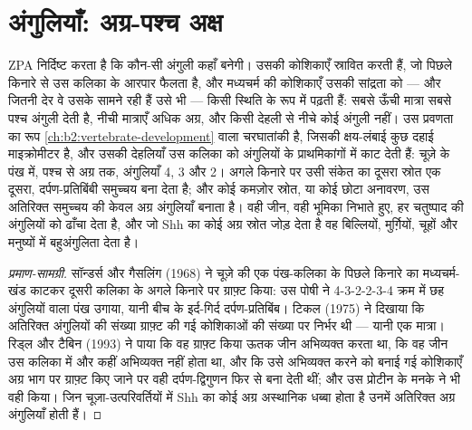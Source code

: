 \section{अंगुलियाँ: अग्र-पश्च अक्ष}

\begin{proposition}[ध्रुवणकारी सक्रियता क्षेत्र]\label{prop:b2:limb-organogenesis:zpa}
ZPA निर्दिष्ट करता है कि कौन-सी अंगुली कहाँ बनेगी। उसकी कोशिकाएँ
 स्रावित करती हैं, जो पिछले किनारे से उस कलिका के
आरपार फैलता है, और मध्यचर्म की कोशिकाएँ उसकी सांद्रता को --- और जितनी
देर वे उसके सामने रही हैं उसे भी --- किसी स्थिति के रूप में पढ़ती हैं:
सबसे ऊँची मात्रा सबसे पश्च अंगुली देती है, नीची मात्राएँ अधिक अग्र, और
किसी देहली से नीचे कोई अंगुली नहीं। उस प्रवणता का रूप
\cref{ch:b2:vertebrate-development} वाला चरघातांकी है, जिसकी क्षय-लंबाई
कुछ दहाई माइक्रोमीटर है, और उसकी देहलियाँ उस कलिका को
अंगुलियों के प्राथमिकांगों में काट देती हैं: चूज़े के पंख में, पश्च से
अग्र तक, अंगुलियाँ 4, 3 और 2। अगले किनारे पर उसी संकेत का दूसरा स्रोत
एक दूसरा, दर्पण-प्रतिबिंबी समुच्चय बना देता है; और कोई कमज़ोर स्रोत, या
कोई छोटा अनावरण, उस अतिरिक्त समुच्चय की केवल अग्र अंगुलियाँ बनाता है।
वही जीन, वही भूमिका निभाते हुए, हर चतुष्पाद की अंगुलियों को ढाँचा देता
है, और जो  Shh का कोई अग्र स्रोत जोड़ देता है वह
बिल्लियों, मुर्ग़ियों, चूहों और मनुष्यों में बहुअंगुलिता देता है।
\end{proposition}
\begin{proof}[प्रमाण-सामग्री]
सॉन्डर्स और गैसलिंग (1968) ने चूज़े की एक पंख-कलिका के पिछले किनारे का
मध्यचर्म-खंड काटकर दूसरी कलिका के अगले किनारे पर ग्राफ़्ट किया:
उस पोषी ने 4-3-2-2-3-4 क्रम में छह अंगुलियों वाला पंख उगाया, यानी
बीच के इर्द-गिर्द दर्पण-प्रतिबिंब। टिकल (1975) ने दिखाया कि अतिरिक्त
अंगुलियों की संख्या ग्राफ़्ट की गई कोशिकाओं की संख्या पर निर्भर थी ---
यानी एक मात्रा। रिड्ल और टैबिन (1993) ने पाया कि वह ग्राफ़्ट किया ऊतक
जीन \emph{} अभिव्यक्त करता था, कि वह जीन उस कलिका में और
कहीं अभिव्यक्त नहीं होता था, और कि उसे अभिव्यक्त करने को बनाई गई
कोशिकाएँ अग्र भाग पर ग्राफ़्ट किए जाने पर वही दर्पण-द्विगुणन फिर से बना
देती थीं; और उस प्रोटीन के मनके ने भी वही किया। जिन चूज़ा-उत्परिवर्तियों
में Shh का कोई अग्र अस्थानिक धब्बा होता है उनमें अतिरिक्त अग्र अंगुलियाँ होती हैं।
\end{proof}

